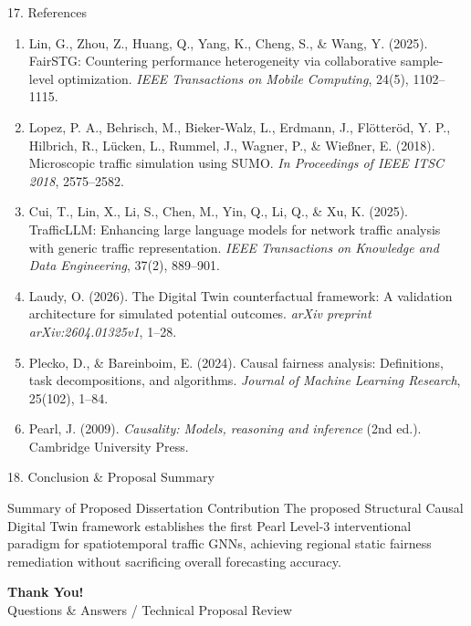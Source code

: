 \documentclass[aspectratio=169, 10pt]{beamer}
\begin{document}
\begin{frame}[allowframebreaks]{17. References}
\begin{enumerate}
    \item Lin, G., Zhou, Z., Huang, Q., Yang, K., Cheng, S., \& Wang, Y. (2025). FairSTG: Countering performance heterogeneity via collaborative sample-level optimization. \textit{IEEE Transactions on Mobile Computing}, 24(5), 1102–1115.
    
    \item Lopez, P. A., Behrisch, M., Bieker-Walz, L., Erdmann, J., Flötteröd, Y. P., Hilbrich, R., Lücken, L., Rummel, J., Wagner, P., \& Wießner, E. (2018). Microscopic traffic simulation using SUMO. \textit{In Proceedings of IEEE ITSC 2018}, 2575–2582.
    
    \item Cui, T., Lin, X., Li, S., Chen, M., Yin, Q., Li, Q., \& Xu, K. (2025). TrafficLLM: Enhancing large language models for network traffic analysis with generic traffic representation. \textit{IEEE Transactions on Knowledge and Data Engineering}, 37(2), 889–901.
    
    \item Laudy, O. (2026). The Digital Twin counterfactual framework: A validation architecture for simulated potential outcomes. \textit{arXiv preprint arXiv:2604.01325v1}, 1–28.
    
    \item Plecko, D., \& Bareinboim, E. (2024). Causal fairness analysis: Definitions, task decompositions, and algorithms. \textit{Journal of Machine Learning Research}, 25(102), 1–84.
    
    \item Pearl, J. (2009). \textit{Causality: Models, reasoning and inference} (2nd ed.). Cambridge University Press.
  \end{enumerate}
\end{frame}

\begin{frame}{18. Conclusion \& Proposal Summary}
  \begin{block}{Summary of Proposed Dissertation Contribution}
    The proposed Structural Causal Digital Twin framework establishes the first Pearl Level-3 interventional paradigm for spatiotemporal traffic GNNs, achieving regional static fairness remediation without sacrificing overall forecasting accuracy.
  \end{block}

  \vspace{0.4cm}

  \centering
  \Large \textbf{Thank You!} \\
  \vspace{0.2cm}
  \small Questions \& Answers / Technical Proposal Review
\end{frame}
\end{document}
